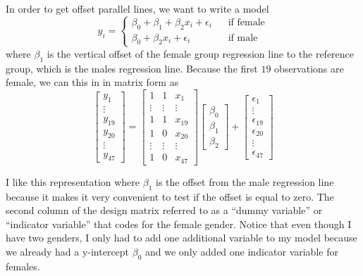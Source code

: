 \documentclass[]{book}
\theoremstyle{definition}
\theoremstyle{definition}
\theoremstyle{remark}
\begin{document}
In order to get offset parallel lines, we want to write a model
\[y_{i}=\begin{cases}
\beta_{0}+\beta_{1}+\beta_{2}x_{i}+\epsilon_{i} & \;\;\;\textrm{if female}\\
\beta_{0}+\beta_{2}x_{i}+\epsilon_{i} & \;\;\;\textrm{if male}
\end{cases}\] where \(\beta_{1}\) is the vertical offset of the female
group regression line to the reference group, which is the males
regression line. Because the first \(19\) observations are female, we
can this in in matrix form as \[\left[\begin{array}{c}
y_{1}\\
\vdots\\
y_{19}\\
y_{20}\\
\vdots\\
y_{47}
\end{array}\right]=\left[\begin{array}{ccc}
1 & 1 & x_{1}\\
\vdots & \vdots & \vdots\\
1 & 1 & x_{19}\\
1 & 0 & x_{20}\\
\vdots & \vdots & \vdots\\
1 & 0 & x_{47}
\end{array}\right]\left[\begin{array}{c}
\beta_{0}\\
\beta_{1}\\
\beta_{2}
\end{array}\right]+\left[\begin{array}{c}
\epsilon_{1}\\
\vdots\\
\epsilon_{19}\\
\epsilon_{20}\\
\vdots\\
\epsilon_{47}
\end{array}\right]\]

I like this representation where \(\beta_{1}\) is the offset from the
male regression line because it makes it very convenient to test if the
offset is equal to zero. The second column of the design matrix referred
to as a ``dummy variable'' or ``indicator variable'' that codes for the
female gender. Notice that even though I have two genders, I only had to
add one additional variable to my model because we already had a
y-intercept \(\beta_{0}\) and we only added one indicator variable for
females.
\end{document}

